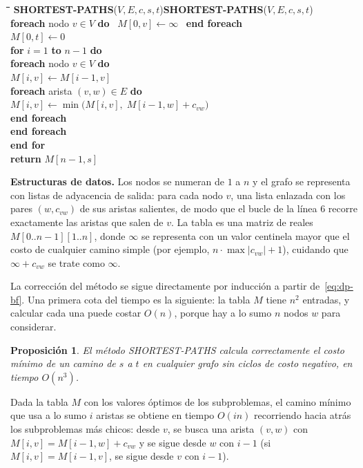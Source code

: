 \documentclass[12pt, spanish, oneside, openany]{book}
\newcommand{\pl}[1]{\makebox[1.6em][r]{\texttt{\footnotesize #1}}\hspace{0.9em}}
\newenvironment{pseudo}[1]{%
  \begin{center}%
  \begin{mdframed}[style=pseudobox]%
  \small
  \begin{tabbing}%
  \hspace{2.5em}\=\hspace{1.5em}\=\hspace{1.5em}\=\hspace{1.5em}\=\hspace{1.5em}\=\kill
  \def\pseudotitulo{#1}\ifx\pseudotitulo\empty\else#1\\[3pt]\fi}%
  {\end{tabbing}\end{mdframed}\end{center}}
\newenvironment{estructuras}%
  {\begin{center}\begin{minipage}{0.93\textwidth}\begin{mdframed}[style=estrbox]%
   \small\textbf{Estructuras de datos.}\;}%
  {\end{mdframed}\end{minipage}\end{center}}
\newcommand{\alg}[1]{#1}
\theoremstyle{uprightplain}
\newtheorem{proposicion}[teorema]{Proposición}
\theoremstyle{definition}
\theoremstyle{remark}
\theoremstyle{definition}
\begin{document}
\begin{pseudo}{\textbf{SHORTEST-PATHS}($V, E, c, s, t$)}
\pl{1}\> \textbf{foreach} nodo $v \in V$ \textbf{do} \ $M[0,v] \leftarrow \infty$ \ \textbf{end foreach}\\
\pl{2}\> $M[0,t] \leftarrow 0$\\
\pl{3}\> \textbf{for} $i = 1$ \textbf{to} $n-1$ \textbf{do}\\
\pl{4}\>\> \textbf{foreach} nodo $v \in V$ \textbf{do}\\
\pl{5}\>\>\> $M[i,v] \leftarrow M[i-1,v]$\\
\pl{6}\>\>\> \textbf{foreach} arista $(v,w) \in E$ \textbf{do}\\
\pl{7}\>\>\>\> $M[i,v] \leftarrow \min\bigl(M[i,v],\; M[i-1,w]+c_{vw}\bigr)$\\
\pl{8}\>\>\> \textbf{end foreach}\\
\pl{9}\>\> \textbf{end foreach}\\
\pl{10}\> \textbf{end for}\\
\pl{11}\> \textbf{return} $M[n-1,s]$
\end{pseudo}

\begin{estructuras}
Los nodos se numeran de $1$ a $n$ y el grafo se representa con listas de
adyacencia de salida: para cada nodo $v$, una lista enlazada con los pares
$(w,c_{vw})$ de sus aristas salientes, de modo que el bucle de la línea $6$
recorre exactamente las aristas que salen de $v$. La tabla es una matriz de
reales $M[0..n-1][1..n]$, donde $\infty$ se representa con un valor centinela
mayor que el costo de cualquier camino simple (por ejemplo, $n\cdot\max|c_{vw}|+1$),
cuidando que $\infty+c_{vw}$ se trate como $\infty$.
\end{estructuras}

La corrección del método se sigue directamente por inducción a partir de~\eqref{eq:dp-bf}. Una primera cota del tiempo es la siguiente: la tabla $M$ tiene $n^2$ entradas, y calcular cada una puede costar $O(n)$, porque hay a lo sumo $n$ nodos $w$ para considerar.

\begin{proposicion}
\label{prop:dp-bf-n3}
El método \alg{SHORTEST-PATHS} calcula correctamente el costo mínimo de un camino de $s$ a $t$ en cualquier grafo sin ciclos de costo negativo, en tiempo $O(n^3)$.
\end{proposicion}

Dada la tabla $M$ con los valores óptimos de los subproblemas, el camino mínimo que usa a lo sumo $i$ aristas se obtiene en tiempo $O(in)$ recorriendo hacia atrás los subproblemas más chicos: desde $v$, se busca una arista $(v,w)$ con $M[i,v]=M[i-1,w]+c_{vw}$ y se sigue desde $w$ con $i-1$ (si $M[i,v]=M[i-1,v]$, se sigue desde $v$ con $i-1$).
\end{document}
